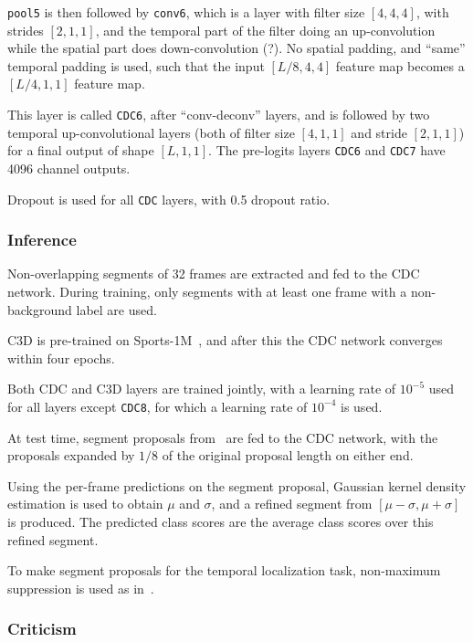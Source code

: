 \documentclass[a4paper, 12pt]{article}
\begin{document}
\verb|pool5| is then followed by \verb|conv6|, which is a layer with filter
size $[4, 4, 4]$, with strides $[2, 1, 1]$, and the temporal part of the filter
doing an up-convolution while the spatial part does down-convolution (?). No
spatial padding, and ``same'' temporal padding is used, such that the input
$[L/8, 4, 4]$ feature map becomes a $[L/4, 1, 1]$ feature map.

This layer is called \verb|CDC6|, after ``conv-deconv'' layers, and is followed
by two temporal up-convolutional layers (both of filter size $[4, 1, 1]$ and
stride $[2, 1, 1]$) for a final output of shape $[L, 1, 1]$.  The pre-logits
layers \verb|CDC6| and \verb|CDC7| have 4096 channel outputs.

Dropout is used for all \verb|CDC| layers, with 0.5 dropout ratio.

\subsubsection{Inference}

Non-overlapping segments of 32 frames are extracted and fed to the CDC network.
During training, only segments with at least one frame with a non-background
label are used.

C3D is pre-trained on Sports-1M~\citet{KarpathyCVPR14}, and after this the CDC
network converges within four epochs.

Both CDC and C3D layers are trained jointly, with a learning rate of
$10^{-5}$ used for all layers except \verb|CDC8|, for which a learning rate
of $10^{-4}$ is used.

At test time, segment proposals from~\citet{DBLP:journals/corr/ShouWC16} are
fed to the CDC network, with the proposals expanded by $1/8$ of the original
proposal length on either end.

Using the per-frame predictions on the segment proposal, Gaussian kernel
density estimation is used to obtain $\mu$ and $\sigma$, and a refined segment
from $[\mu - \sigma, \mu + \sigma]$ is produced. The predicted class scores are
the average class scores over this refined segment.

To make segment proposals for the temporal localization task, non-maximum
suppression is used as
in~\citet{DBLP:journals/corr/YeungRJAML15, DBLP:journals/corr/ShouWC16}.

\subsubsection{Criticism}
\end{document}
